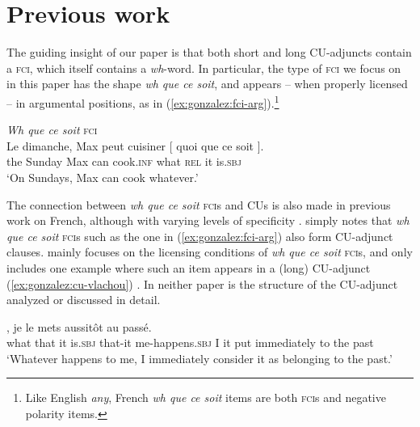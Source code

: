 \documentclass[output=paper]{langscibook}
\begin{document}
\section{Previous work}\label{sec:gonzalez:2}



The guiding insight of our paper is that both short and long CU-adjuncts contain a \textsc{fci}, which itself contains a \emph{wh}-word. In particular, the type of \textsc{fci} we focus on in this paper has the shape \emph{wh que ce soit}, and appears -- when properly licensed \citep[a.o.]{vlachou2007} -- in argumental positions, as in (\ref{ex:gonzalez:fci-arg}).\footnote{Like English \textit{any}, French \emph{wh que ce soit} items are both \textsc{fci}s and negative polarity items.} 


\ea\label{ex:gonzalez:fci-arg} \emph{Wh que ce soit} \textsc{fci} \\
 \gll Le dimanche, Max peut cuisiner [ quoi que ce soit ]. \\
 the Sunday Max can cook.\textsc{inf} {} what \textsc{rel} it is.\textsc{sbj}  \\ %
 \glt `On Sundays, Max can cook whatever.' 
\z



The connection between \emph{wh que ce soit} \textsc{fci}s and CUs is also made in previous work on French, although with varying levels of specificity \citep{muller2006,vlachou2007, corblin2010}. \citet[][13]{muller2006} simply notes that \emph{wh que ce soit} \textsc{fci}s such as the one in (\ref{ex:gonzalez:fci-arg}) also form CU-adjunct clauses. \citet[][]{vlachou2007} mainly focuses on the licensing conditions of \emph{wh que ce soit} \textsc{fci}s, and only includes one example where such an item appears in a (long) CU-adjunct (\ref{ex:gonzalez:cu-vlachou}) \citep[][103]{vlachou2007}. In neither paper is the structure of the CU-adjunct analyzed or discussed in detail. 




\ea\label{ex:gonzalez:cu-vlachou} 
 ,  je le mets aussitôt au passé. \\
 {} what that it is.\textsc{sbj}  that-it me-happens.\textsc{sbj} {} I it put immediately {to the} past \\ %
 \glt `Whatever happens to me, I immediately consider it as belonging to the past.' 
\z

 
\end{document}
